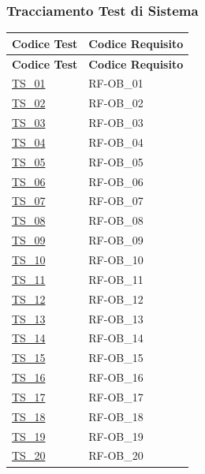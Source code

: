 \subsubsection{Tracciamento Test di Sistema}
\begin{longtable}{|
    >{\raggedright\arraybackslash}p{} |
    >{\centering\arraybackslash}p{} |
    }
    \hline
    \rowcolor[gray]{0.9}
    \textbf{Codice Test} & \textbf{Codice Requisito}\\
    \hline
    \endfirsthead

    \hline
    \rowcolor[gray]{0.9}
    \textbf{Codice Test} & \textbf{Codice Requisito}\\
    \hline
    \endhead

    \hline
    \hyperlink{ts-01}{TS\_01} & RF-OB\_01 \\ \hline
    \hyperlink{ts-02}{TS\_02} & RF-OB\_02 \\ \hline
    \hyperlink{ts-03}{TS\_03} & RF-OB\_03 \\ \hline
    \hyperlink{ts-04}{TS\_04} & RF-OB\_04 \\ \hline
    \hyperlink{ts-05}{TS\_05} & RF-OB\_05 \\ \hline
    \hyperlink{ts-06}{TS\_06} & RF-OB\_06 \\ \hline
    \hyperlink{ts-07}{TS\_07} & RF-OB\_07 \\ \hline
    \hyperlink{ts-08}{TS\_08} & RF-OB\_08 \\ \hline
    \hyperlink{ts-09}{TS\_09} & RF-OB\_09 \\ \hline
    \hyperlink{ts-10}{TS\_10} & RF-OB\_10 \\ \hline
    \hyperlink{ts-11}{TS\_11} & RF-OB\_11 \\ \hline
    \hyperlink{ts-12}{TS\_12} & RF-OB\_12 \\ \hline
    \hyperlink{ts-13}{TS\_13} & RF-OB\_13 \\ \hline
    \hyperlink{ts-14}{TS\_14} & RF-OB\_14 \\ \hline
    \hyperlink{ts-15}{TS\_15} & RF-OB\_15 \\ \hline
    \hyperlink{ts-16}{TS\_16} & RF-OB\_16 \\ \hline
    \hyperlink{ts-17}{TS\_17} & RF-OB\_17 \\ \hline
    \hyperlink{ts-18}{TS\_18} & RF-OB\_18 \\ \hline
    \hyperlink{ts-19}{TS\_19} & RF-OB\_19 \\ \hline
    \hyperlink{ts-20}{TS\_20} & RF-OB\_20 \\ \hline

\end{longtable}
